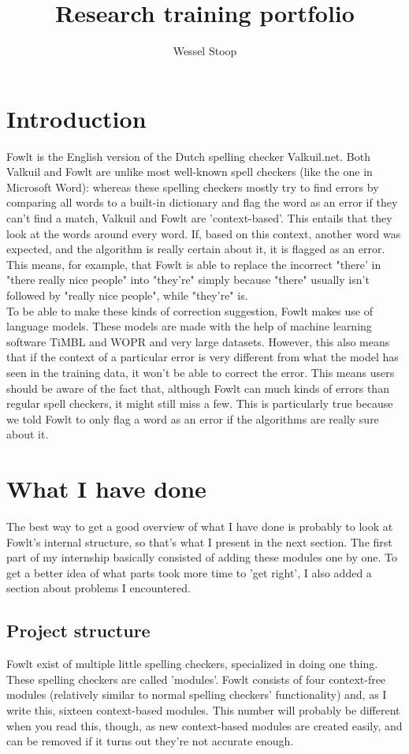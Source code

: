 \documentclass[12pt]{article}
\title{Research training portfolio}
\author{Wessel Stoop}
\begin{document}
\maketitle

\section{Introduction}
Fowlt is the English version of the Dutch spelling checker Valkuil.net. Both Valkuil and Fowlt are unlike most well-known spell checkers (like the one in Microsoft Word): whereas these spelling checkers mostly try to find errors by comparing all words to a built-in dictionary and flag the word as an error if they can't find a match, Valkuil and Fowlt are 'context-based'. This entails that they look at the words around every word. If, based on this context, another word was expected, and the algorithm is really certain about it, it is flagged as an error. This means, for example, that Fowlt is able to replace the incorrect "there' in "there really nice people" into "they're" simply because "there" usually isn't followed by "really nice people", while "they're" is. 
\\\indent
To be able to make these kinds of correction suggestion, Fowlt makes use of language models. These models are made with the help of machine learning software TiMBL and WOPR and very large datasets. However, this also means that if the context of a particular error is very different from what the model has seen in the training data, it won't be able to correct the error. This means users should be aware of the fact that, although Fowlt can much kinds of errors than regular spell checkers, it might still miss a few. This is particularly true because we told Fowlt to only flag a word as an error if the algorithms are really sure about it.

\section{What I have done}
The best way to get a good overview of what I have done is probably to look at Fowlt's internal structure, so that's what I present in the next section. The first part of my internship basically consisted of adding these modules one by one. To get a better idea of what parts took more time to 'get right', I also added a section about problems I encountered.

\subsection{Project structure}
Fowlt exist of multiple little spelling checkers, specialized in doing one thing. These spelling checkers are called 'modules'. Fowlt consists of four context-free modules (relatively similar to normal spelling checkers' functionality) and, as I write this, sixteen context-based modules. This number will probably be different when you read this, though, as new context-based modules are created easily, and can be removed if it turns out they're not accurate enough.
\end{document}
